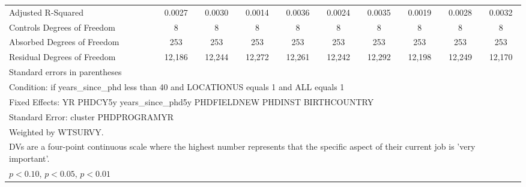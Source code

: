 \begin{table}[htbp]
\begin{tabular}{l*{9}{c}}
Adjusted R-Squared&      0.0027         &      0.0030         &      0.0014         &      0.0036         &      0.0024         &      0.0035         &      0.0019         &      0.0028         &      0.0032         \\
Controls Degrees of Freedom&           8         &           8         &           8         &           8         &           8         &           8         &           8         &           8         &           8         \\
Absorbed Degrees of Freedom&         253         &         253         &         253         &         253         &         253         &         253         &         253         &         253         &         253         \\
Residual Degrees of Freedom&      12,186         &      12,244         &      12,272         &      12,261         &      12,242         &      12,292         &      12,198         &      12,249         &      12,170         \\
\hline\hline
\multicolumn{10}{l}{\footnotesize Standard errors in parentheses}\\
\multicolumn{10}{l}{\footnotesize Condition: if years\_since\_phd less than 40 and LOCATIONUS equals 1 and ALL equals 1}\\
\multicolumn{10}{l}{\footnotesize Fixed Effects: YR PHDCY5y years\_since\_phd5y PHDFIELDNEW PHDINST BIRTHCOUNTRY}\\
\multicolumn{10}{l}{\footnotesize Standard Error: cluster PHDPROGRAMYR}\\
\multicolumn{10}{l}{\footnotesize Weighted by WTSURVY.}\\
\multicolumn{10}{l}{\footnotesize DVs are a four-point continuous scale where the highest number represents that the specific aspect of their current job is 'very important'.}\\
\multicolumn{10}{l}{\footnotesize \sym{*} \(p<0.10\), \sym{**} \(p<0.05\), \sym{***} \(p<0.01\)}\\
\end{tabular}
\end{table}
